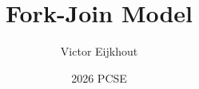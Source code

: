 \documentclass[10pt]{beamer}
\begin{document}
\author[Eijkhout]{Victor Eijkhout}
\date[2026]{2026 PCSE}
\title[forkjoin]{Fork-Join Model}
\maketitle


\end{document}
